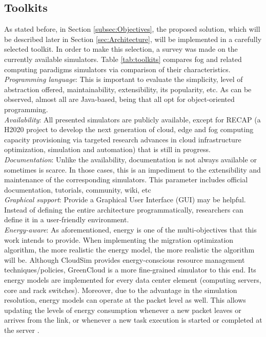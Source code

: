\subsection{Toolkits}
\label{sec:Toolkits}
As stated before, in Section \ref{subsec:Objectives}, the proposed solution, which will be described later in Section \ref{sec:Architecture}, will be implemented in a carefully selected toolkit. In order to make this selection, a survey was made on the currently available simulators. Table \ref{tab:toolkits} compares fog and related computing paradigms simulators via comparison of their characteristics.\\
\noindent\tab \textit{Programming language}: This is important to evaluate the simplicity, level of abstraction offered, maintainability, extensibility, its popularity, etc. As can be observed, almost all are Java-based, being that all opt for object-oriented programming.\\
\noindent\tab \textit{Availability}: All presented simulators are publicly available, except for RECAP (a H2020 project to develop the next generation of cloud, edge and fog computing capacity provisioning via targeted research advances in cloud infrastructure optimization, simulation and automation) that is still in progress.\\
\noindent\tab \textit{Documentation}: Unlike the availability, documentation is not always available or sometimes is scarce. In those cases, this is an impediment to the extensibility and maintenance of the corresponding simulators. This parameter includes official documentation, tutorials, community, wiki, etc\\
\noindent\tab \textit{Graphical support}: Provide a Graphical User Interface (GUI) may be helpful. Instead of defining the entire architecture programmatically, researchers can define it in a user-friendly environment.\\
\noindent\tab \textit{Energy-aware}: As aforementioned, energy is one of the multi-objectives that this work intends to provide. When implementing the migration optimization algorithm, the more realistic the energy model, the more realistic the algorithm will be. Although CloudSim provides energy-conscious resource management techniques/policies, GreenCloud is a more fine-grained simulator to this end. Its energy models are implemented for every data center element (computing servers, core and rack switches). Moreover, due to the advantage in the simulation resolution, energy models can operate at the packet level as well. This allows updating the levels of energy consumption whenever a new packet leaves or arrives from the link, or whenever a new task execution is started or completed at the server \cite{kliazovich2012greencloud}.\\
